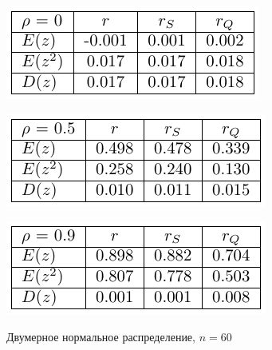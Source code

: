 \documentclass[a4paper]{article}
\begin{document}
\begin{table}[H]
    \begin{center}
    \includegraphics[]{LabSrcs/resources/60rho0.pdf}
    \end{center}
    \begin{center}
    \includegraphics[]{LabSrcs/resources/60rho0.5.pdf}
    \end{center}
    \begin{center}
    \includegraphics[]{LabSrcs/resources/60rho0.9.pdf}
    \end{center}
    \caption{Двумерное нормальное распределение, $n=60$}
    \label{tab:norm60}
\end{table}
\end{document}
